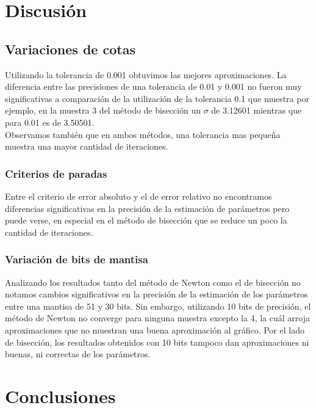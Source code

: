 \documentclass[a4paper,10pt,twoside]{article}
\begin{document}
\section{Discusión}

\subsection{Variaciones de cotas}
Utilizando la tolerancia de 0.001 obtuvimos las mejores aproximaciones. La diferencia entre las precisiones de una tolerancia de 0.01 y 0.001 no fueron muy significativas a comparación de la utilización de la tolerancia 0.1 que muestra por ejemplo, en la muestra 3 del método de bisección un $\sigma$ de 3.12601 mientras que para 0.01 es de 3.50501. \\
Observamos también que en ambos métodos, una tolerancia mas pequeña muestra una mayor cantidad de iteraciones.

\subsubsection{Criterios de paradas}
Entre el criterio de error absoluto y el de error relativo no encontramos diferencias significativas en la precisión de la estimación de parámetros pero puede verse, en especial en el método de bisección que se reduce un poco la cantidad de iteraciones.

\subsubsection{Variación de bits de mantisa}
Analizando los resultados tanto del método de Newton como el de bisección no notamos cambios significativos en la precisión de la estimación de los parámetros entre una mantisa de 51 y 30 bits. Sin embargo, utilizando 10 bits de precisión, el método de Newton no converge para ninguna muestra excepto la 4, la cuál arroja aproximaciones que no muestran una buena aproximación al gráfico. Por el lado de bisección, los resultados obtenidos con 10 bits tampoco dan aproximaciones ni buenas, ni correctas de los parámetros.




\section{Conclusiones}
\end{document}
